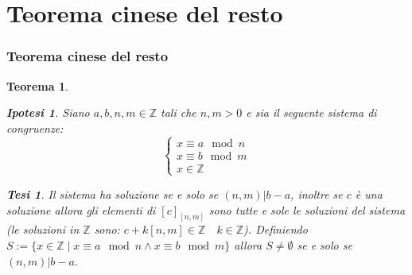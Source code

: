 \documentclass{article}
\makeatletter
\renewenvironment{proof}[1][\proofname]{\par
    \pushQED{\qed}%
    \normalfont \topsep6\p@\@plus6\p@\relax
    \trivlist
    \item\relax
    {\itshape
    #1\@addpunct{.}}\hspace\labelsep\ignorespaces
    }{%
    \popQED\endtrivlist\@endpefalse
}
\newtheorem{theorem}{Teorema}[part]
\newtheorem{ipothesis}[lemma]{Ipotesi}
\newtheorem{thesis}[lemma]{Tesi}
\theoremstyle{definition}
\newcommand{\Z}{\mathbb{Z}}
\makeatother
\begin{document}
\part{Teorema cinese del resto}
\section{Teorema cinese del resto}
\begin{theorem}
    \begin{ipothesis}
        Siano \(a,b,n,m\in\mathbb{Z}\) tali che \(n,m>0\) e sia il seguente sistema di congruenze:
        \[
            \begin{cases}
                x\equiv a\mod n\\
                x\equiv b\mod m\\
                x\in\mathbb{Z}
            \end{cases}
        \]
    \end{ipothesis}
    \begin{thesis}
        Il sistema ha soluzione se e solo se \((n,m)|b-a\), inoltre se \(c\) è una soluzione allora gli elementi di \([c]_{[n,m]}\) sono tutte e sole le soluzioni del sistema (le soluzioni in \(\mathbb{Z}\) sono: \( c+k[n,m]\in\Z\quad k\in\Z \)).
        Definiendo \(S:=\{x\in\mathbb{Z}\mid x\equiv a\mod n\land x\equiv b\mod m\}\) allora \(S\neq\emptyset\) se e solo se \((n,m)|b-a\).
    \end{thesis}
    \begin{proof}


\end{proof}
\end{theorem}
\end{document}
